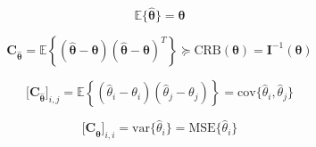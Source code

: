 \begin{itemize}
    $$
    \mathbb{E}\{\hat{\boldsymbol{\theta}}\}=\boldsymbol{\theta}
    $$


    $$
    \mathbf{C}_{\hat{\boldsymbol{\theta}}}
    =\mathbb{E}\!\left\{(\hat{\boldsymbol{\theta}}-\boldsymbol{\theta})     (\hat{\boldsymbol{\theta}}-\boldsymbol{\theta})^{T}\right\}
    \succeq \mathrm{CRB}(\boldsymbol{\theta})=\mathbf{I}^{-1}(\boldsymbol{\theta})
    $$


    $$
    \big[\mathbf{C}_{\hat{\boldsymbol{\theta}}}\big]_{i,j}
    =\mathbb{E}\!\left\{(\hat{\theta}_{i}-\theta_{i})(\hat{\theta}_{j}-\theta_{j})\right\}
    =\mathrm{cov}\{\hat{\theta}_{i},\hat{\theta}_{j}\}
    $$


    $$
    \big[\mathbf{C}_{\hat{\boldsymbol{\theta}}}\big]_{i,i}
    =\mathrm{var}\{\hat{\theta}_{i}\}
    =\mathrm{MSE}\{\hat{\theta}_{i}\}
    $$



\end{itemize}
